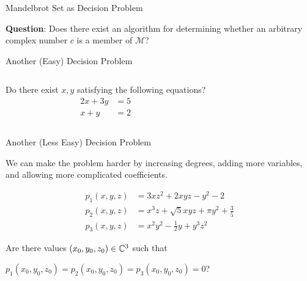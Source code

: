 \documentclass[c]{beamer}
\begin{document}
\begin{frame}{Mandelbrot Set as Decision Problem}
  
  \textbf{Question}: Does there exist an algorithm for determining
  whether an arbitrary complex number $c$ is a member of
  $\mathcal{M}$?
  
\end{frame}

\begin{frame}{Another (Easy) Decision Problem}
  
  \begin{columns}
    
    Do there exist $x, y$ satisfying the following equations?
    \begin{align*}
      2x + 3y &= 5\\
      x + y &= 2
    \end{align*}


    \begin{center}
    \end{center}
  \end{columns}
\end{frame}

\begin{frame}{Another (Less Easy) Decision Problem}
 
  We can make the problem harder by increasing degrees, adding more
  variables, and allowing more complicated coefficients.
  
  \vspace{-\baselineskip}

  \begin{align*}
    p_1(x, y, z) &= 3xz^2 + 2xyz - y^2 - 2\\
    p_2(x, y, z) &= x^3z + \sqrt{5}xyz + \pi y^2 + \frac{3}{5}\\
    p_3(x, y, z) &= x^2y^2 - \frac{1}{2}y + y^3z^2
  \end{align*}\pause
  
  Are there values $(x_0, y_0, z_0) \in \mathbb{C}^3$ such that

  \vspace{\baselineskip}

  $p_1(x_0, y_0, z_0) = p_2(x_0, y_0, z_0) = p_3(x_0, y_0, z_0) = 0$?
  
\end{frame}
\end{document}
